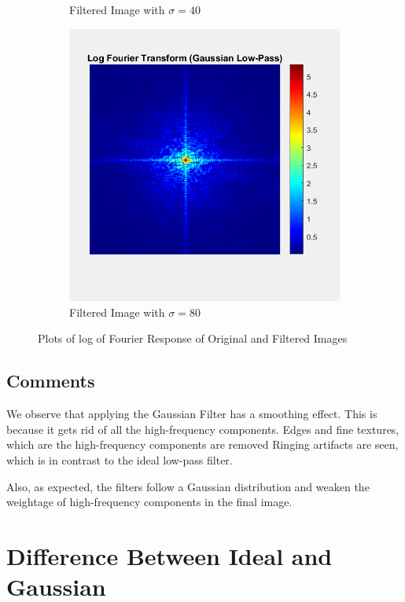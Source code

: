 \documentclass[a4paper]{article}
\begin{document}
\begin{figure}[h]
\begin{subfigure}{0.33\linewidth}
        \caption{Filtered Image with $ \sigma=40$}
    \end{subfigure}
    \begin{subfigure}{0.33\linewidth}
        \centering
        \includegraphics[width=\linewidth]{80_image_fo.png}
        \caption{Filtered Image with $ \sigma=80$}
    \end{subfigure}
    \caption{Plots of log of Fourier Response of Original and Filtered Images}
    \label{fig:bo}
\end{figure}

\subsection{Comments}
We observe that applying the Gaussian Filter has a smoothing effect. This is because it gets rid of all the high-frequency components. Edges and fine textures, which are the high-frequency components are removed Ringing artifacts are seen, which is in contrast to the ideal low-pass filter.

Also, as expected, the filters follow a Gaussian distribution and weaken the weightage of high-frequency components in the final image.

\section{Difference Between Ideal and Gaussian}
\end{document}
